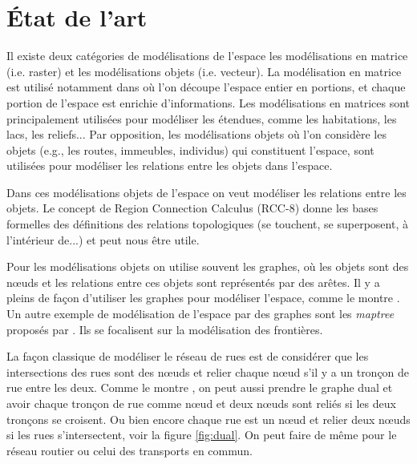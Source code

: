 \documentclass[a4paper]{article}
\begin{document}
\section{État de l'art}
\label{etat}

Il existe deux catégories de modélisations de l'espace les modélisations en
matrice (i.e. raster) et les modélisations objets (i.e. vecteur). La
modélisation en matrice est utilisé notamment dans \cite{batty1999} où l'on
découpe l'espace entier en portions, et chaque portion de l'espace est enrichie
d'informations. Les modélisations en matrices sont principalement utilisées pour
modéliser les étendues, comme les habitations, les lacs, les reliefs... Par
opposition, les modélisations objets où l'on considère les objets (e.g., les
routes, immeubles, individus) qui constituent l'espace, sont utilisées pour
modéliser les relations entre les objets dans l'espace.

Dans ces modélisations objets de l'espace on veut modéliser les relations
entre les objets. Le concept de Region Connection Calculus
(RCC-8) \cite{randell1992} donne les bases formelles des définitions
des relations topologiques (se touchent, se superposent, à l'intérieur
de...) et peut nous être utile.

Pour les modélisations objets on utilise souvent les graphes, où les objets sont
des nœuds et les relations entre ces objets sont représentés par des arêtes. Il y
a pleins de façon d'utiliser les graphes pour modéliser l'espace, comme le
montre \cite{dale2010}. Un autre exemple de modélisation de l'espace par des
graphes sont les \emph{maptree} proposés par \cite{worboys2012}. Ils se
focalisent sur la modélisation des frontières.

La façon classique de modéliser le réseau de rues est de considérer que les
intersections des rues sont des nœuds et relier chaque nœud s'il y a un tronçon
de rue entre les deux. Comme le montre \cite{porta2005}, on peut aussi prendre
le graphe dual et avoir chaque tronçon de rue comme nœud et deux nœuds sont
reliés si les deux tronçons se croisent. Ou bien encore chaque rue est un nœud
et relier deux nœuds si les rues s'intersectent, voir la figure \ref{fig:dual}.
On peut faire de même pour le réseau routier ou celui des transports en commun.
\end{document}
